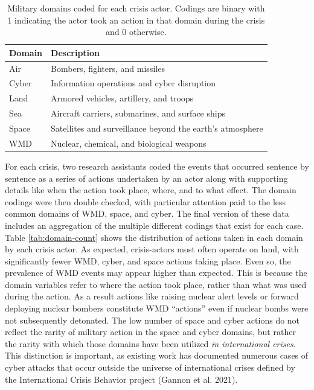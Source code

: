 \documentclass[
]{article}
\begin{document}
\begin{table}[]
\caption{Military domains coded for each crisis actor. Codings are binary with 1 indicating the actor took an action in that domain during the crisis and 0 otherwise.}
\label{tab:domains}
\centering
\begin{tabular}{|l|l|}
\hline
\textbf{Domain} & \textbf{Description} \\
\hline
Air & Bombers, fighters, and missiles \\
Cyber & Information operations and cyber disruption \\
Land & Armored vehicles, artillery, and troops \\
Sea & Aircraft carriers, submarines, and surface ships \\
Space & Satellites and surveillance beyond the earth's atmosphere \\
WMD & Nuclear, chemical, and biological weapons \\ 
\hline
\end{tabular}
\end{table}

For each crisis, two research assistants coded the events that occurred sentence by sentence as a series of actions undertaken by an actor along with supporting details like when the action took place, where, and to what effect. The domain codings were then double checked, with particular attention paid to the less common domains of WMD, space, and cyber. The final version of these data includes an aggregation of the multiple different codings that exist for each case. Table \ref{tab:domain-count} shows the distribution of actions taken in each domain by each crisis actor. As expected, crisis-actors most often operate on land, with significantly fewer WMD, cyber, and space actions taking place. Even so, the prevalence of WMD events may appear higher than expected. This is because the domain variables refer to where the action took place, rather than what was used during the action. As a result actions like raising nuclear alert levels or forward deploying nuclear bombers constitute WMD ``actions'' even if nuclear bombs were not subsequently detonated. The low number of space and cyber actions do not reflect the rarity of military action in the space and cyber domains, but rather the rarity with which those domains have been utilized \textit{in international crises}. This distinction is important, as existing work has documented numerous cases of cyber attacks that occur outside the universe of international crises defined by the International Crisis Behavior project (Gannon et al. 2021).
\end{document}
